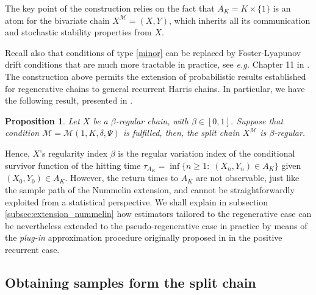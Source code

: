 \documentclass[sn-mathphys-ay]{sn-jnl}%
\newtheorem{proposition}{Proposition}[section]%
\begin{document}
\begin{appendices}
The key point of the construction relies on the fact that $A_K=K\times \{1\}$ is an
atom for the bivariate chain $X^{\mathcal{M}}=(X,Y)$, which inherits all its
communication and stochastic stability properties from $X$.

Recall also that conditions of type \eqref{minor} can be replaced by Foster-Lyapunov
drift conditions that are much more tractable in practice, see \textit{e.g.} Chapter
11 in \cite{Meyn2009}. The construction above permits the extension of probabilistic
results established for regenerative chains to general recurrent Harris chains. In
particular, we have the following result, presented in \cite[pp 19]{Chen1999}.

\begin{proposition}\label{prop:split_chain_beta_regular}
    Let $X$ be a $\beta$-regular chain, with $\beta\in [0,1]$. Suppose that condition $\mathcal{M}=\mathcal{M}(1,K,\delta,\Psi)$ is fulfilled,  then, the split chain $X^{\mathcal{M}}$ is $\beta$-regular.
\end{proposition}

Hence, $X$'s regularity index $\beta$ is the regular variation index of the
conditional survivor function of the hitting time $\tau_{A_K}=\inf\{n\geq 1:\;
    (X_n,Y_n)\in A_K\}$ given $(X_0,Y_0)\in A_K$. However, the return times to $A_K$ are
not observable, just like the sample path of the Nummelin extension, and cannot be
straightforwardly exploited from a statistical perspective. We shall explain in
subsection \ref{subsec:extension_nummelin} how estimators tailored to the
regenerative case can be nevertheless extended to the pseudo-regenerative case in
practice by means of the \textit{plug-in} approximation procedure originally proposed
in \cite{Bertail2006} in the positive recurrent case.

\subsection{Obtaining samples form the split chain}\label{sec:samples_split_chain}


\end{appendices}
\end{document}
